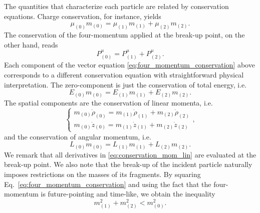 The quantities that characterize each particle are related by conservation equations. Charge conservation, for instance, yields
\begin{equation}
    \mu_{(0)} m_{(0)}  = \mu_{(1)} m_{(1)} + \mu_{(2)} m_{(2)}.
    \label{eq:charge_conservation}
\end{equation}
The conservation of the four-momentum applied at the break-up point, on the other hand, reads
\begin{equation}
    P^{\mu}_{(0)} = P^{\mu}_{(1)} + P^{\mu}_{(2)}.
    \label{eq:four_momentum_conservation}
\end{equation}
Each component of the vector equation \eqref{eq:four_momentum_conservation} above corresponds to a different conservation equation with straightforward physical interpretation. The zero-component is just the conservation of total energy, i.e.
\begin{equation}
    E_{(0)}m_{(0)} = E_{(1)}m_{(1)} + E_{(2)}m_{(2)}.
    \label{eq:conservation_of_energy}
\end{equation}
The spatial components are the conservation of linear momenta, i.e.
\begin{equation}
    \begin{cases}
        m_{(0)}\dot{\rho}_{(0)} = m_{(1)}\dot{\rho}_{(1)} +m_{(2)}\dot{\rho}_{(2)} \\
        m_{(0)}\dot{z}_{(0)} = m_{(1)}\dot{z}_{(1)} + m_{(2)}\dot{z}_{(2)}
    \end{cases},
    \label{eq:conservation_mom_lin}
\end{equation}
and the conservation of angular momentum, i.e.
\begin{equation}
    L_{(0)}m_{(0)} = L_{(1)} m_{(1)} + L_{(2)}m_{(2)}.
    \label{eq:conservation_mom_ang}
\end{equation}
We remark that all derivatives in \eqref{eq:conservation_mom_lin} are evaluated at the break-up point. We also note that the break-up of the incident particle naturally imposes restrictions on the masses of its fragments. By squaring Eq.~\eqref{eq:four_momentum_conservation} and using the fact that the four-momentum is future-pointing and time-like, we obtain the inequality~\cite{bhat1985energetics}
\begin{equation} \label{eq:mass_constraint}
    m_{(1)}^2 + m_{(2)}^2 < m_{(0)}^2.
\end{equation}

